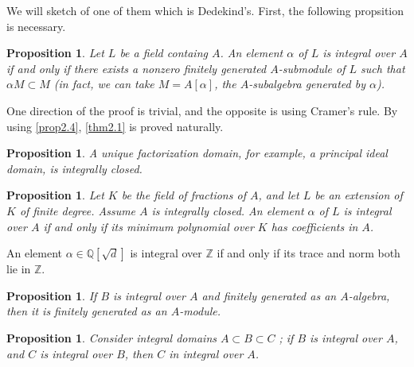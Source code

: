 \documentclass[11pt,a4paper,reqno]{amsart}
\numberwithin{equation}{section}
\newtheorem{lem}[thm]{Lemma}
\newtheorem{prop}[thm]{Proposition}
\newtheorem{rmk}[thm]{Remark}
\begin{document}
We will sketch of one of them which is Dedekind's. 
First, the following propsition is necessary. 

\begin{prop} \label{m2.4} 
Let $L$ be a field containg $A$. 
An element $\alpha$ of $L$ is integral over $A$ 
if and only if 
there exists a nonzero finitely generated $A$-submodule of $L$ 
such that 
$\alpha M \subset M$ 
(in fact, we can take $M=A[\alpha]$, 
the $A$-subalgebra generated by $\alpha$). 
\end{prop} 

One direction of the proof is trivial, and the opposite is using Cramer's rule. 
By using \ref{prop2.4}, \ref{thm2.1} is proved naturally. 

\begin{prop} \label{prop 2.9} 
A unique factorization domain, for example, a principal ideal domain, is integrally closed. 
\end{prop}
 

\begin{prop} \label{prop 2.11} 
Let $K$ be the field of fractions of $A$, 
and let $L$ be an extension of $K$ of finite degree. 
Assume $A$ is integrally closed. 
An element $\alpha$ of $L$ is integral over $A$ 
if and only if its minimum polynomial over $K$ has coefficients in $A$. 
\end{prop} 

An element $\alpha \in \mathbb{Q} [\sqrt d]$ is integral over $\mathbb{Z}$ 
if and only if its trace and norm both lie in $\mathbb{Z}$. 

\begin{prop} \label{prop 2.13} 
If $B$ is integral over $A$ and finitely generated as an $A$-algebra, 
then it is finitely generated as an $A$-module. 
\end{prop} 


\begin{prop} \label{prop 2.15} 
Consider integral domains $A \subset B \subset C$ ; 
if $B$ is integral over $A$, and $C$ is integral over $B$, then $C$ in integral over $A$. 
\end{prop} 
\end{document}
